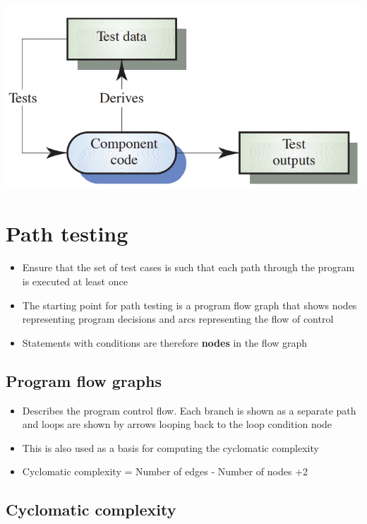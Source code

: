 \documentclass{article}
\begin{document}
\begin{center}
  \includegraphics[scale=0.5]{white_box_testing.png}
\end{center}

\section{Path testing}
\begin{itemize}
  \item Ensure that the set of test cases is such that each path through the program is executed at least once 
  \item The starting point for path testing is a program flow graph that shows nodes representing program decisions and arcs representing the flow of control 
  \item Statements with conditions are therefore \textbf{nodes} in the flow graph
\end{itemize}

\subsection{Program flow graphs}

\begin{itemize}
  \item Describes the program control flow. Each branch is shown as a separate path and loops are shown by arrows looping back to the loop condition node 
  \item This is also used as a basis for computing the cyclomatic complexity 
  \item Cyclomatic complexity = Number of edges - Number of nodes +2
\end{itemize}

\subsection{Cyclomatic complexity}
\end{document}
